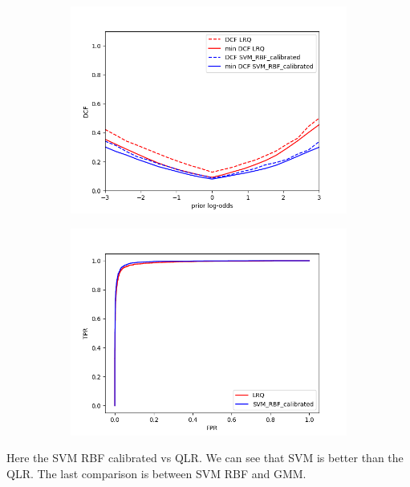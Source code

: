 \documentclass[english]{report}
\begin{document}
\begin{figure}[H]
    \begin{subfigure}{0.5\textwidth}
        \includegraphics[scale=0.5]{../../images/comparison/evaluation/DCF_LRQ&SVM_RBF_calibrated}
    \end{subfigure}
    \begin{subfigure}{0.5\textwidth}
        \includegraphics[scale=0.5]{../../images/comparison/evaluation/ROC_LRQ&SVM_RBF_calibrated}
    \end{subfigure}
    \label{fig:eval_MVGvsSVMcalib}
\end{figure}
Here the SVM RBF calibrated vs QLR. We can see that SVM is better than the QLR. The last comparison
is between SVM RBF and GMM.
\end{document}
